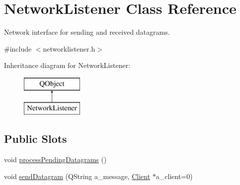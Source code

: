 \hypertarget{class_network_listener}{}\section{Network\+Listener Class Reference}
\label{class_network_listener}


Network interface for sending and received datagrams.  




{\ttfamily \#include $<$networklistener.\+h$>$}

Inheritance diagram for Network\+Listener\+:\begin{figure}[H]
\begin{center}
\leavevmode
\includegraphics[height=2.000000cm]{class_network_listener}
\end{center}
\end{figure}
\subsection*{Public Slots}
\begin{DoxyCompactItemize}
\item 
void \hyperlink{class_network_listener_a831238cc68f68ecac14a9a5b3d330f1b}{process\+Pending\+Datagrams} ()
\item 
void \hyperlink{class_network_listener_a99aa1b32a4f64ad0c2d651b2a5ac9325}{send\+Datagram} (Q\+String a\+\_\+message, \hyperlink{struct_client}{Client} $\ast$a\+\_\+client=0)
\end{DoxyCompactItemize}
